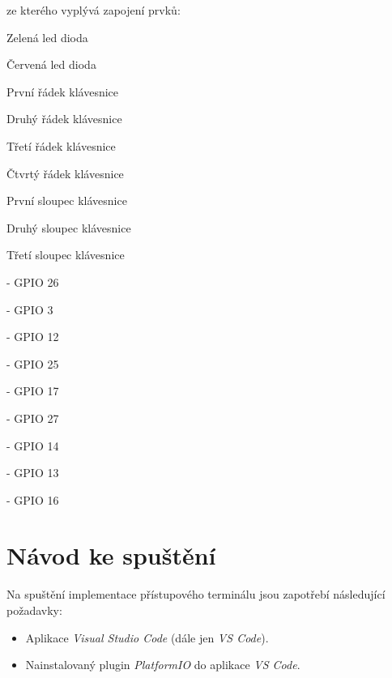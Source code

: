 \documentclass[a4paper, 12pt]{article}
\begin{document}
\vspace{0.25cm}

ze kterého vyplývá zapojení prvků:

\begin{itemize}
\begin{minipage}{0.35\linewidth}   
        \item Zelená led dioda        
        \item Červená led dioda
        \item První řádek klávesnice
        \item Druhý řádek klávesnice
        \item Třetí řádek klávesnice
        \item Čtvrtý řádek klávesnice        
        \item První sloupec klávesnice
        \item Druhý sloupec klávesnice
        \item Třetí sloupec klávesnice        
    \end{minipage}
    \begin{minipage}{0.5\linewidth}
        \item[-] GPIO 26
        \item[-] GPIO 3
        \item[-] GPIO 12
        \item[-] GPIO 25
        \item[-] GPIO 17
        \item[-] GPIO 27
        \item[-] GPIO 14
        \item[-] GPIO 13
        \item[-] GPIO 16
    \end{minipage}
\end{itemize}

\newpage

\section{Návod ke spuštění}
Na spuštění implementace přístupového terminálu jsou zapotřebí následující požadavky:

\begin{itemize}
    \item Aplikace \textit{Visual Studio Code} (dále jen \textit{VS Code})\cite{vsCode}.
    \item Nainstalovaný plugin \textit{PlatformIO}\cite{platformio} do aplikace \textit{VS Code}.
\end{itemize}
\end{document}
